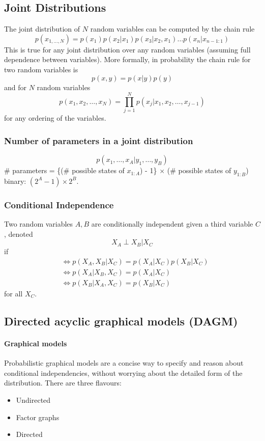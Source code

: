 \documentclass[11pt]{article}
\begin{document}
\subsection{Joint Distributions}
The joint distribution of \(N\) random variables can be computed by the chain rule
\[
p\left(x_{1, \ldots, N}\right)=p\left(x_{1}\right) p\left(x_{2} | x_{1}\right) p\left(x_{3} | x_{2}, x_{1}\right) \ldots p\left(x_{n} | x_{n-1: 1}\right)
\]
This is true for any joint distribution over any random variables (assuming full dependence between variables).
More formally, in probability the chain rule for two random variables is
\[
p(x, y)=p(x | y) p(y)
\]
and for \(N\) random variables
$$p(x_1, x_2, \hdots, x_N) = \prod_{j=1}^N p(x_j|x_1,x_2,\hdots,x_{j-1})$$
for any ordering of the variables.

\subsubsection{Number of parameters in a joint distribution}
$$p(x_1, \hdots, x_A | y_1, \hdots, y_B)$$
$\#$ parameters = \{($\#$ possible states of $x_{1:A}$) - 1\} $\times$ ($\#$ possible states of $y_{1:B}$)\\
binary: $(2^A - 1)\times 2^B$.

\subsubsection{Conditional Independence}
Two random variables $A, B$ are conditionally independent given a third variable $C$, denoted
$$X_A \perp X_B | X_C$$
if 
\begin{align*}
	&\iff p(X_A, X_B | X_C) = p(X_A|X_C)p(X_B|X_C) \\
	&\iff p(X_A|X_B,X_C) = p(X_A|X_C)\\
	&\iff p(X_B|X_A,X_C) = p(X_B|X_C)
\end{align*}
for all $X_C$.


\subsection{Directed acyclic graphical models (DAGM)}
\paragraph{Graphical models}
Probabilistic graphical models are a concise way to specify and reason about conditional independencies, without worrying about the detailed form of the distribution. There are three flavours:
\begin{itemize}
	\item Undirected
	\item Factor graphs
	\item Directed
\end{itemize}
\end{document}
